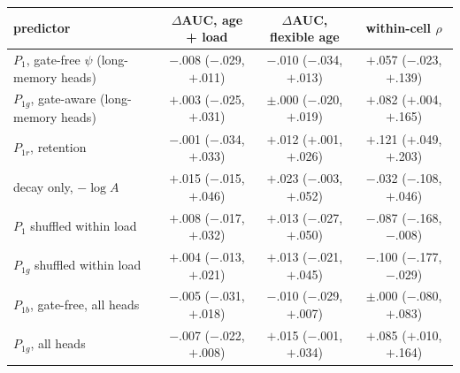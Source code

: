 \begin{tabular}{lccc}
\toprule
predictor & $\Delta$AUC, age + load & $\Delta$AUC, flexible age & within-cell $\rho$ \\
\midrule
$P_1$, gate-free $\psi$ (long-memory heads) & $-$.008 ($-$.029, $+$.011) & $-$.010 ($-$.034, $+$.013) & $+$.057 ($-$.023, $+$.139) \\
$P_{1g}$, gate-aware (long-memory heads) & $+$.003 ($-$.025, $+$.031) & $\pm$.000 ($-$.020, $+$.019) & $+$.082 ($+$.004, $+$.165) \\
$P_{1r}$, retention & $-$.001 ($-$.034, $+$.033) & $+$.012 ($+$.001, $+$.026) & $+$.121 ($+$.049, $+$.203) \\
decay only, $-\log A$ & $+$.015 ($-$.015, $+$.046) & $+$.023 ($-$.003, $+$.052) & $-$.032 ($-$.108, $+$.046) \\
$P_1$ shuffled within load & $+$.008 ($-$.017, $+$.032) & $+$.013 ($-$.027, $+$.050) & $-$.087 ($-$.168, $-$.008) \\
$P_{1g}$ shuffled within load & $+$.004 ($-$.013, $+$.021) & $+$.013 ($-$.021, $+$.045) & $-$.100 ($-$.177, $-$.029) \\
$P_{1b}$, gate-free, all heads & $-$.005 ($-$.031, $+$.018) & $-$.010 ($-$.029, $+$.007) & $\pm$.000 ($-$.080, $+$.083) \\
$P_{1g}$, all heads & $-$.007 ($-$.022, $+$.008) & $+$.015 ($-$.001, $+$.034) & $+$.085 ($+$.010, $+$.164) \\
\bottomrule
\end{tabular}
